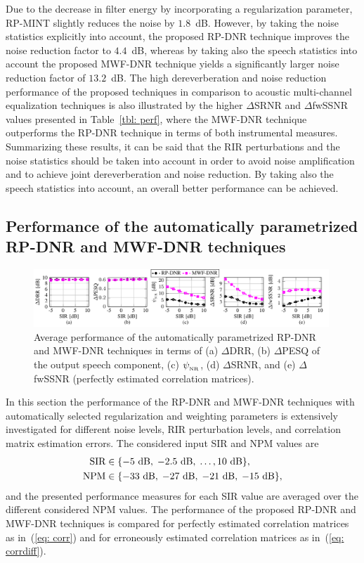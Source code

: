 \documentclass[draftcls,onecolumn,11pt]{IEEEtran}
\begin{document}
Due to the decrease in filter energy by incorporating a regularization parameter, RP-MINT slightly reduces the noise by $1.8$~dB.
However, by taking the noise statistics explicitly into account, the proposed RP-DNR technique improves the noise reduction factor to $4.4$~dB, whereas by taking also the speech statistics into account the proposed MWF-DNR technique yields a significantly larger noise reduction factor of $13.2$~dB. 
The high dereverberation and noise reduction performance of the proposed techniques in comparison to acoustic multi-channel equalization techniques is also illustrated by the higher $\Delta$SRNR and $\Delta$fwSSNR values presented in Table~\ref{tbl: perf}, where the MWF-DNR technique outperforms the RP-DNR technique in terms of both instrumental measures. 
Summarizing these results, it can be said that the RIR perturbations and the noise statistics should be taken into account in order to avoid noise amplification and to achieve joint dereverberation and noise reduction.
By taking also the speech statistics into account, an overall better performance can be achieved.

\subsection{Performance of the automatically parametrized RP-DNR and MWF-DNR techniques}
\label{sec: expc}
\begin{figure}[b!]
\centering
\includegraphics[width = 0.99\textwidth]{Plots2/perf_all.pdf}
\caption{Average performance of the automatically parametrized RP-DNR and MWF-DNR techniques in terms of (a) $\Delta$DRR, (b) $\Delta$PESQ of the output speech component, (c) $\psi_{_{\rm NR}} $, (d) $\Delta$SRNR, and (e) $\Delta$fwSSNR (perfectly estimated correlation matrices).}
\label{fig: perfect}
\end{figure}
In this section the performance of the RP-DNR and MWF-DNR techniques with automatically selected regularization and weighting parameters is extensively investigated for different noise levels, RIR perturbation levels, and correlation matrix estimation errors. 
The considered input SIR and NPM values are
\begin{align}
{\text{SIR}} &\in \{ -5~{\rm dB}, \; -2.5~{\rm dB}, \; \ldots, 10~{\rm dB} \}, \\
{\text{NPM}} &\in \{ -33~{\rm dB}, \; -27~{\rm dB}, \; -21~{\rm dB}, \; -15~{\rm dB} \},
\end{align}
and the presented performance measures for each SIR value are averaged over the different considered NPM values. 
The performance of the proposed RP-DNR and MWF-DNR techniques is compared for perfectly estimated correlation matrices as in~(\ref{eq: corr}) and for erroneously estimated correlation matrices as in~(\ref{eq: corrdiff}).
\end{document}
